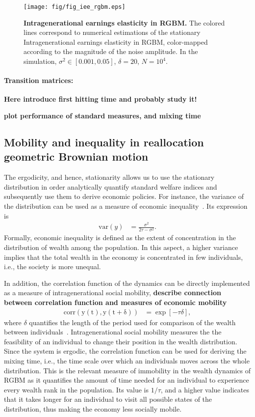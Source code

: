 \documentclass[11pt]{article}
\numberwithin{equation}{section}
\begin{document}
\begin{figure}[t!]
\texttt{[image: fig/fig\_iee\_rgbm.eps]}
\caption{\textbf{Intragenerational earnings elasticity in RGBM.} The colored lines correspond to numerical estimations of the stationary Intragenerational earnings elasticity in RGBM, color-mapped according to the magnitude of the noise amplitude. In the simulation, $\sigma^2 \in \left[ 0.001, 0.05\right]$, $\delta = 20$, $N = 10^4$. \label{fig:rgbm-iee}}
\end{figure}

\paragraph{Transition matrices:}

\textbf{Here introduce first hitting time and probably study it!}


\textbf{plot performance of standard measures, and mixing time}
\subsection{Mobility and inequality in reallocation geometric Brownian motion}\label{sec:inequality}

The ergodicity, and hence, stationarity allows us to use the stationary distribution in order analytically quantify standard welfare indices and subsequently use them to derive economic policies. For instance, the variance of the distribution can be used as a measure of economic inequality~\cite{berman2017empirical}. Its expression is
\begin{align}
\mathrm{var}(y) &= \frac{\sigma^2}{2 \tau - \sigma^2}.
\label{eq:rgbm-var}
\end{align}
Formally, economic inequality is defined as the extent of concentration in the distribution of wealth among the population. In this aspect, a higher variance implies that the total wealth in the economy is concentrated in few individuals, i.e., the society is more unequal.

In addition, the correlation function of the dynamics can be directly implemented as a measure of intragenerational social mobility, \textbf{describe connection between correlation function and measures of economic mobility}
\begin{align}
    \mathrm{corr(y(t), y(t+\delta))} &= \exp\left[ -\tau \delta \right],
    \label{eq:rgbm-mobility}
\end{align}
where $\delta$ quantifies the length of the period used for comparison of the wealth between individuals~\cite{liu2017correlation}.
Intragenerational social mobility measures the the feasibility of an individual to change their position in the wealth distribution. Since the system is ergodic, the correlation function can be used for deriving the mixing time, i.e., the time scale over which an individuals moves across the whole distribution. This is the relevant measure of immobility in the wealth dynamics of RGBM as it quantifies the amount of time needed for an individual to experience every wealth rank in the population. Its value is $1/\tau$, and a higher value indicates that it takes longer for an individual to visit all possible states of the distribution, thus making the economy less socially mobile.
\end{document}

